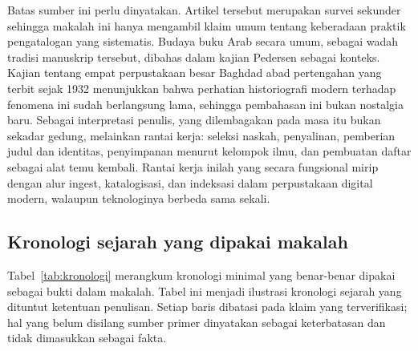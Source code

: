 \documentclass[12pt,a4paper]{article}
\begin{document}
Batas sumber ini perlu dinyatakan. Artikel tersebut merupakan survei sekunder sehingga makalah ini hanya mengambil klaim umum tentang keberadaan praktik pengatalogan yang sistematis. Budaya buku Arab secara umum, sebagai wadah tradisi manuskrip tersebut, dibahas dalam kajian Pedersen sebagai konteks.\autocite{pedersen1984} Kajian tentang empat perpustakaan besar Baghdad abad pertengahan yang terbit sejak 1932 menunjukkan bahwa perhatian historiografi modern terhadap fenomena ini sudah berlangsung lama, sehingga pembahasan ini bukan nostalgia baru.\autocite{mackensen1932} Sebagai interpretasi penulis, yang dilembagakan pada masa itu bukan sekadar gedung, melainkan rantai kerja: seleksi naskah, penyalinan, pemberian judul dan identitas, penyimpanan menurut kelompok ilmu, dan pembuatan daftar sebagai alat temu kembali. Rantai kerja inilah yang secara fungsional mirip dengan alur ingest, katalogisasi, dan indeksasi dalam perpustakaan digital modern, walaupun teknologinya berbeda sama sekali.

\subsection{Kronologi sejarah yang dipakai makalah}

Tabel~\ref{tab:kronologi} merangkum kronologi minimal yang benar-benar dipakai sebagai bukti dalam makalah. Tabel ini menjadi ilustrasi kronologi sejarah yang dituntut ketentuan penulisan. Setiap baris dibatasi pada klaim yang terverifikasi; hal yang belum disilang sumber primer dinyatakan sebagai keterbatasan dan tidak dimasukkan sebagai fakta.
\end{document}
